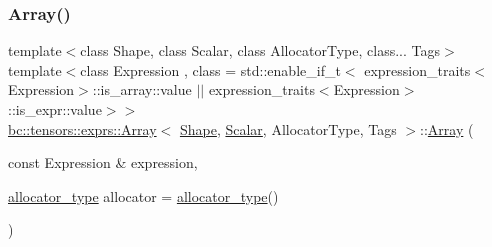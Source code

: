 \mbox{\label{structbc_1_1tensors_1_1exprs_1_1Array_a33daff032fc7d980dc4c9e336570a718}} 
\subsubsection{\texorpdfstring{Array()}{Array()}\hspace{0.1cm}{\footnotesize\ttfamily [8/9]}}
{\footnotesize\ttfamily template$<$class Shape, class Scalar, class Allocator\+Type, class... Tags$>$ \\
template$<$class Expression , class  = std\+::enable\+\_\+if\+\_\+t$<$			expression\+\_\+traits$<$\+Expression$>$\+::is\+\_\+array\+::value $\vert$$\vert$			expression\+\_\+traits$<$\+Expression$>$\+::is\+\_\+expr\+::value$>$$>$ \\
\hyperlink{structbc_1_1tensors_1_1exprs_1_1Array}{bc\+::tensors\+::exprs\+::\+Array}$<$ \hyperlink{structbc_1_1Shape}{Shape}, \hyperlink{namespacebc_aa12ac55ee2c43dc082894dd3859daee1}{Scalar}, Allocator\+Type, Tags $>$\+::\hyperlink{structbc_1_1tensors_1_1exprs_1_1Array}{Array} (\begin{DoxyParamCaption}\item[{const Expression \&}]{expression,  }\item[{\hyperlink{structbc_1_1tensors_1_1exprs_1_1Array_a990afcebe8817075d427f2653d197140}{allocator\+\_\+type}}]{allocator = {\ttfamily \hyperlink{structbc_1_1tensors_1_1exprs_1_1Array_a990afcebe8817075d427f2653d197140}{allocator\+\_\+type}()} }\end{DoxyParamCaption})\hspace{0.3cm}{\ttfamily [inline]}}

\mbox{\label{structbc_1_1tensors_1_1exprs_1_1Array_a7cc7a7eb294c67d96f66c52598382991}} 
